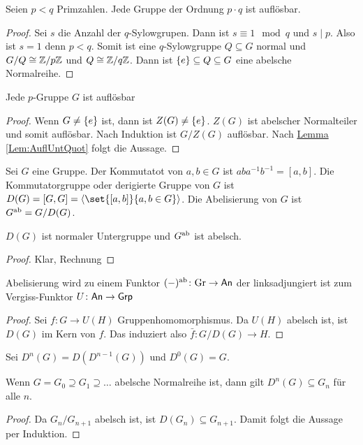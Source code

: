 \begin{Satz}
    Seien $p<q$ Primzahlen. Jede Gruppe der Ordnung $p\cdot q$ ist auflösbar.
\end{Satz}
\begin{proof}
    Sei $s$ die Anzahl der $q$-Sylowgrupen. Dann ist $s\equiv 1\mod q$ und $s\mid p$. Also ist $s=1$ denn $p<q$. Somit ist eine $q$-Sylowgruppe $Q\subseteq G$ normal und $G/Q\cong \mathbb{Z}/p\mathbb{Z}$ und $Q\cong\mathbb{Z}/q\mathbb{Z}$. Dann ist $\{e\}\subseteq Q\subseteq G$ eine abelsche Normalreihe.
\end{proof}
\begin{Satz}
    Jede $p$-Gruppe $G$ ist auflösbar
\end{Satz}
\begin{proof}
    Wenn $G\neq \{e\}$ ist, dann ist $Z(G)\neq \{e\}$. $Z(G)$ ist abelscher Normalteiler und somit auflösbar. Nach Induktion ist $G/Z(G)$ auflösbar. Nach \hyperref[Lem:AuflUntQuot]{Lemma \ref{Lem:AuflUntQuot}} folgt die Aussage.
\end{proof}
\begin{Def}
    Sei $G$ eine Gruppe. Der Kommutatot von $a,b\in G$ ist $aba^{-1}b^{-1}=[a,b]$.
    Die Kommutatorgruppe oder derigierte Gruppe von $G$ ist $D(G)=[G,G]=\anglebr{\set{[a,b]}{a,b\in G}}$. Die Abelisierung von $G$ ist $G^{\mathrm{ab}}=G/D(G)$.
\end{Def}
\begin{Lemma}
    $D(G)$ ist normaler Untergruppe und $G^{\mathrm{ab}}$ ist abelsch.
\end{Lemma}
\begin{proof}
    Klar, Rechnung
\end{proof}
\begin{Satz}
    Abelisierung wird zu einem Funktor $(-)^{\mathrm{ab}}\colon\mathrm{Gr}\to\mathsf{An}$ der linksadjungiert ist zum Vergiss-Funktor $U\colon \mathsf{An}\to \mathsf{Grp}$
\end{Satz}
\begin{proof}
    Sei $f\colon G\to U(H)$ Gruppenhomomorphismus. Da $U(H)$ abelsch ist, ist $D(G)$ im Kern von $f$. Das induziert also $\bar f\colon G/D(G)\to H$.
\end{proof}
\begin{Def}
    Sei $D^n(G)=D(D^{n-1}(G))$ und $D^0(G)=G.$
\end{Def}
\begin{Bem}
    Wenn $G=G_0\supseteq G_1\supseteq\dots$ abelsche Normalreihe ist, dann gilt $D^n(G)\subseteq G_n$ für alle $n$.
\end{Bem}
\begin{proof}
    Da $G_n/G_{n+1}$ abelsch ist, ist $D(G_n)\subseteq G_{n+1}$. Damit folgt die Aussage per Induktion.
\end{proof}
